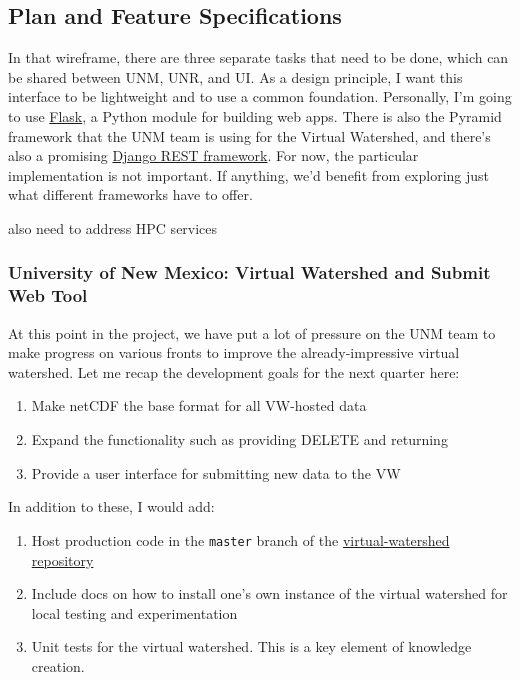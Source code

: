 \documentclass[
11pt, %
a4paper, %
oneside, %
twoside, %
headinclude,footinclude, %
BCOR5mm, %
]{scrartcl}
\begin{document}


\subsection{Plan and Feature Specifications} %
\label{sub:Plan}

In that wireframe, there are three separate tasks that need to be done, which can be shared
between UNM, UNR, and UI. As a design principle, I want this interface to be lightweight and to
use a common foundation. Personally, I'm going to use 
\href{http://flask.pocoo.org/docs/0.10/}{Flask}, a Python module for building web apps. There is
also the Pyramid framework that the UNM team is using for the Virtual Watershed, and there's 
also a promising \href{http://www.django-rest-framework.org/}{Django REST framework}. For now,
the particular implementation is not important. If anything, we'd benefit from exploring just what
different frameworks have to offer.

\large{also need to address HPC services}

\subsubsection{University of New Mexico: Virtual Watershed and Submit Web Tool} %
\label{ssub:UNM_webtool}

At this point in the project, we have put a lot of pressure on the UNM team to make progress
on various fronts to improve the already-impressive virtual watershed. Let me recap the 
development goals for the next quarter here:

\begin{enumerate}
    \item Make netCDF the base format for all VW-hosted data
    \item Expand the functionality such as providing DELETE and returning 
    \item Provide a user interface for submitting new data to the VW
\end{enumerate}

In addition to these, I would add:

\begin{enumerate}
    \item Host production code in the \texttt{master} branch of the \href{https://github.com/tri-state-epscor/virtual-watershed}{virtual-watershed repository}
    \item Include docs on how to install one's own instance of the virtual watershed for local 
        testing and experimentation
    \item Unit tests for the virtual watershed. This is a key element of knowledge creation.
\end{enumerate}
\end{document}
